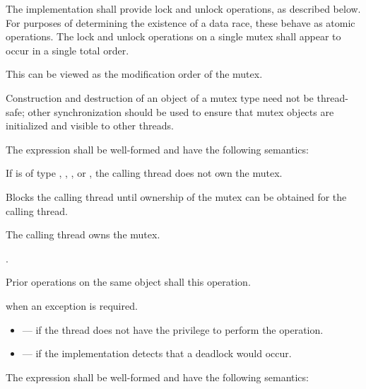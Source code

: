 \pnum
The implementation shall provide lock and unlock operations, as described below.
For purposes of determining the existence of a data race, these behave as
atomic operations. The lock and unlock operations on
a single mutex shall appear to occur in a single total order. \begin{note} This
can be viewed as the modification order of the
mutex. \end{note}
\begin{note} Construction and
destruction of an object of a mutex type need not be thread-safe; other
synchronization should be used to ensure that mutex objects are initialized
and visible to other threads. \end{note}

\pnum
The expression  shall be well-formed and have the following semantics:

\begin{itemdescr}
\pnum
\requires If  is of type , ,
, or , the calling
thread does not own the mutex.

\pnum
\effects Blocks the calling thread until ownership of the mutex can be obtained for the calling thread.

\pnum
\ensures The calling thread owns the mutex.

\pnum
\returntype {}.

\pnum
\sync Prior  operations on the same object shall
 this operation.

\pnum
\throws {} when
an exception is required.

\pnum \errors
\begin{itemize}
\item {} --- if the thread does not have the
privilege to perform the operation.

\item {} --- if the implementation detects
that a deadlock would occur.
\end{itemize}
\end{itemdescr}

\pnum
The expression  shall be well-formed and have the following semantics:

